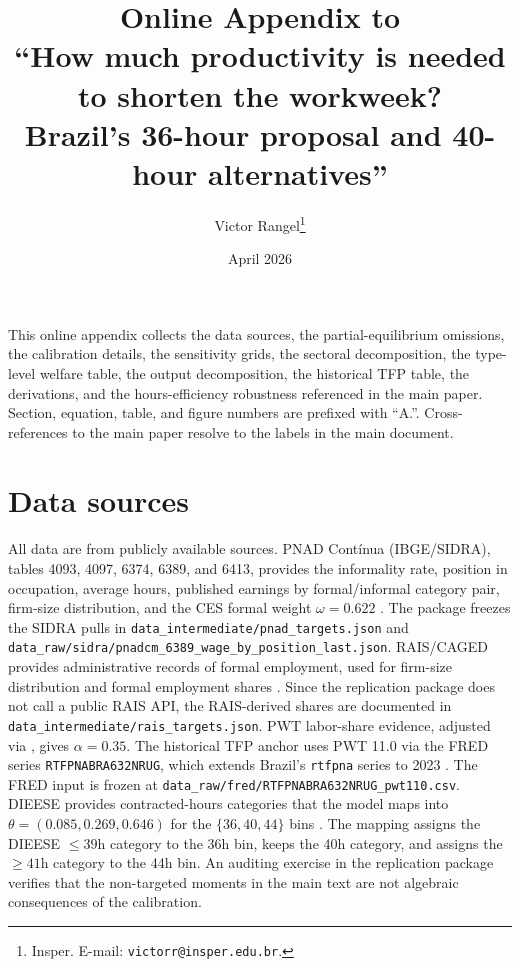 \documentclass[12pt,a4paper]{article}
\title{Online Appendix to\\
``How much productivity is needed to shorten the workweek?\\
Brazil's 36-hour proposal and 40-hour alternatives''}
\author{Victor Rangel\thanks{Insper. E-mail: \texttt{victorr@insper.edu.br}.}}
\date{April 2026}
\begin{document}
\maketitle

This online appendix collects the data sources, the partial-equilibrium omissions, the calibration details, the sensitivity grids, the sectoral decomposition, the type-level welfare table, the output decomposition, the historical TFP table, the derivations, and the hours-efficiency robustness referenced in the main paper. Section, equation, table, and figure numbers are prefixed with ``A.''. Cross-references to the main paper resolve to the labels in the main document.

\tableofcontents
\clearpage

\section{Data sources}\label{app:data}

All data are from publicly available sources. PNAD Cont\'{i}nua (IBGE/SIDRA), tables 4093, 4097, 6374, 6389, and 6413, provides the informality rate, position in occupation, average hours, published earnings by formal/informal category pair, firm-size distribution, and the CES formal weight $\omega=0.622$ \citep{PNAD2025}. The package freezes the SIDRA pulls in \texttt{data\_intermediate/pnad\_targets.json} and \texttt{data\_raw/sidra/pnadcm\_6389\_wage\_by\_position\_last.json}. RAIS/CAGED provides administrative records of formal employment, used for firm-size distribution and formal employment shares \citep{RAIS2022}. Since the replication package does not call a public RAIS API, the RAIS-derived shares are documented in \texttt{data\_intermediate/rais\_targets.json}. PWT labor-share evidence, adjusted via \citet{Gollin2002}, gives $\alpha=0.35$. The historical TFP anchor uses PWT 11.0 via the FRED series \texttt{RTFPNABRA632NRUG}, which extends Brazil's \texttt{rtfpna} series to 2023 \citep{PWT2025,FREDPWTBrazil2026}. The FRED input is frozen at \texttt{data\_raw/fred/RTFPNABRA632NRUG\_pwt110.csv}. DIEESE provides contracted-hours categories that the model maps into $\theta=(0.085, 0.269, 0.646)$ for the $\{36,40,44\}$ bins \citep{DIEESE2024}. The mapping assigns the DIEESE $\leq 39$h category to the 36h bin, keeps the 40h category, and assigns the $\geq 41$h category to the 44h bin. An auditing exercise in the replication package verifies that the non-targeted moments in the main text are not algebraic consequences of the calibration.
\end{document}
